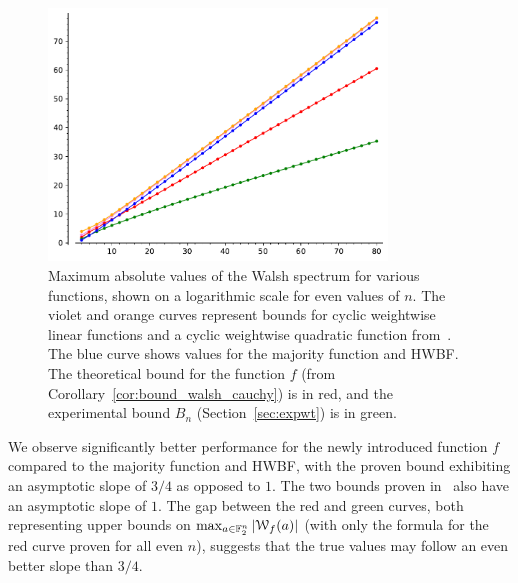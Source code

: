 \documentclass[11pt]{llncs}
\begin{document}
\begin{figure}
	\centering
	\includegraphics[width=9cm]{comparison_walsh_bound.pdf}
	\caption{
		Maximum absolute values of the Walsh spectrum for various functions, shown on a logarithmic scale for even values of $n$. 
		The violet and orange curves represent bounds for cyclic weightwise linear functions and a cyclic weightwise quadratic function from~\cite{DAM:MeaOza24}. The blue curve shows values for the majority function and HWBF. The theoretical bound for the function $f$ (from Corollary~\ref{cor:bound_walsh_cauchy}) is in red, and the experimental bound $B_n$ (Section~\ref{sec:expwt}) is in green.}
	\label{fig:walsh_bound_comparison}
\end{figure}



We observe significantly better performance for the newly introduced function $f$ compared to the majority function and HWBF, with the proven bound exhibiting an asymptotic slope of $ 3/4$ as opposed to $1$. The two bounds proven in~\cite{DAM:MeaOza24} also have an asymptotic slope of $1$.
The gap between the red and green curves, both representing upper bounds on $ \max_{a \in \mathbb{F}_2^n} |\mathcal W_{f}(a)| $ (with only the formula for the red curve proven for all even $n$), suggests that the true values may follow an even better slope than $ 3/4$.
\end{document}
